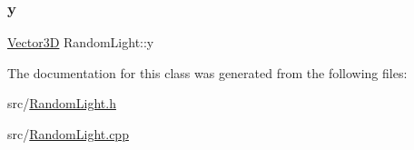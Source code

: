 \subsubsection{\texorpdfstring{y}{y}}
{\footnotesize\ttfamily \mbox{\hyperlink{classVector3D}{Vector3D}} Random\+Light\+::y\hspace{0.3cm}{\ttfamily [private]}}



The documentation for this class was generated from the following files\+:\begin{DoxyCompactItemize}
\item 
src/\mbox{\hyperlink{RandomLight_8h}{Random\+Light.\+h}}\item 
src/\mbox{\hyperlink{RandomLight_8cpp}{Random\+Light.\+cpp}}\end{DoxyCompactItemize}
